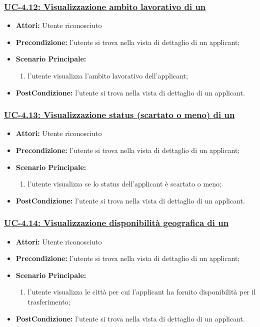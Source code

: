 \subsubsection{\underline{UC-4.12: Visualizzazione ambito lavorativo di un \applicant}}
\begin{itemize}
	\item \textbf{Attori:} Utente riconosciuto
	\item \textbf{Precondizione:} l'utente si trova nella vista di dettaglio di un applicant;
	\item \textbf{Scenario Principale:}
	\begin{enumerate} 
		\item l'utente visualizza l'ambito lavorativo dell'applicant;
	\end{enumerate}
	\item \textbf{PostCondizione:} l'utente si trova nella vista di dettaglio di un applicant.
\end{itemize}

\subsubsection{\underline{UC-4.13: Visualizzazione status (scartato o meno) di un \applicant}}
\begin{itemize}
	\item \textbf{Attori:} Utente riconosciuto
	\item \textbf{Precondizione:} l'utente si trova nella vista di dettaglio di un applicant;
	\item \textbf{Scenario Principale:}
	\begin{enumerate} 
		\item l'utente visualizza se lo status dell'applicant è scartato o meno;
	\end{enumerate}
	\item \textbf{PostCondizione:} l'utente si trova nella vista di dettaglio di un applicant.
\end{itemize}

\subsubsection{\underline{UC-4.14: Visualizzazione disponibilità geografica di un \applicant}}
\begin{itemize}
	\item \textbf{Attori:} Utente riconosciuto
	\item \textbf{Precondizione:} l'utente si trova nella vista di dettaglio di un applicant;
	\item \textbf{Scenario Principale:}
	\begin{enumerate} 
		\item l'utente visualizza le città per cui l'applicant ha fornito disponibilità per il trasferimento;
	\end{enumerate}
	\item \textbf{PostCondizione:} l'utente si trova nella vista di dettaglio di un applicant.
\end{itemize}

